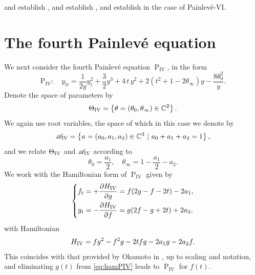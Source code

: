 \documentclass[a4paper,reqno]{amsart}
\numberwithin{equation}{section}
\newcommand\Pfour{\textrm{P}_{\textrm{IV}}}
\newcommand{\C}{\mathbb{C}}
\newcommand{\pain}[1]{\operatorname{P}_{\mathrm{#1}}}
\numberwithin{equation}{section}
\begin{document}
 and  establish ,    and  establish ,
and  establish  in the case of Painlev\'e-VI.























\section{The fourth Painlev\'e equation}\label{sec:PIV}

We next consider the fourth Painlev\'e equation $\pain{IV}$, in the form
\begin{equation*} 
\Pfour:\quad y_{tt}=\displaystyle\frac{1}{2y}y_t^2+ \frac{3}{2} y^3 + 4\, t\,y^2+2(t^2+1-2\theta_\infty)y-\frac{8\theta_0^2}{y}.
\end{equation*}
Denote the space of parameters by 
\begin{equation*}
    \Theta_{\rm{IV}} = \left\{ \theta=(\theta_0, \theta_{\infty}) \in \C^2\right\}.
\end{equation*}
We again use root variables, the space of which in this case we denote by
\begin{equation*}
    \mathscr{A}_{\rm IV} = \left\{ a = (a_0,a_1,a_2) \in \C^3~|~ a_0+a_1+a_2=1\right\},
\end{equation*}
and we relate $\Theta_{\rm{IV}}$ and $\mathscr{A}_{\rm{IV}}$ according to 
\begin{equation} \label{eq:thetatorootvarsPIV}
    \theta_0 = \frac{a_1}{2}, \quad \theta_{\infty} = 1- \frac{a_1}{2}-a_2.
\end{equation}
We work with the Hamiltonian form of $\pain{IV}$ given by
\begin{equation} \label{eq:hamPIV}
    \left\{ 
    \begin{aligned}
        f_t &= + \frac{\partial H_{\rm{IV}}}{\partial g} = f ( 2g - f - 2t) - 2 a_1, \\
        g_t &= - \frac{\partial H_{\rm{IV}}}{\partial f} = g ( 2f - g + 2 t) +2a_2, 
    \end{aligned}
    \right.
\end{equation}
with Hamiltonian 
\begin{equation*}
    H_{\rm{IV}} = f g^2 - f^2 g - 2 t f g - 2 a_1 g - 2 a_2 f.
\end{equation*}
This coincides with that provided by Okamoto in \cite{okamotopolynomialhamiltonians}, up to scaling and notation, and eliminating $g(t)$ from \eqref{eq:hamPIV} leads to $\pain{IV}$ for $f(t)$.
\end{document}
